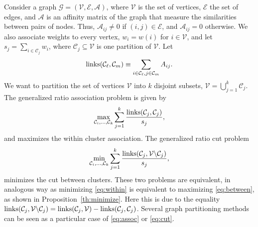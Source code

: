 \documentclass[aps,preprint,nofootinbib,floatfix]{revtex4-1}
\newcommand\C{{\mathcal{C}}}
\begin{document}
Consider a graph $\mathcal{G} = (\mathcal{V}, \mathcal{E}, \mathcal{A})$,
where $\mathcal{V}$ is the set of vertices, $\mathcal{E}$ the set of edges,
and $\mathcal{A}$ is an affinity matrix of the graph 
that measure the 
similarities between pairs of nodes. Thus, $\mathcal{A}_{ij} \ne 0$
if $(i,j) \in \mathcal{E}$, and $\mathcal{A}_{ij} = 0$ otherwise.
We also associate weights to every vertex, 
$w_i = w(i)$ for $i \in \mathcal{V}$, and let $s_j = \sum_{ i \in \C_j} w_i$,
where $\C_j \subseteq \mathcal{V}$ is one partition of $\mathcal{V}$.
Let
\begin{equation}
\textnormal{links}(\C_\ell, \C_m) \equiv 
\sum_{i\in \C_\ell, j\in \C_m } A_{ij} .
\end{equation}
We want to partition the set of vertices $\mathcal{V}$ into $k$ disjoint
subsets, $\mathcal{V} = \bigcup_{j=1}^k \C_j $. 
The generalized ratio association problem is given by
\begin{equation}
\label{eq:assoc}
\max_{\C_i,\dots,\C_k} \sum_{j=1}^k \dfrac{\textnormal{links}(\C_j,\C_j)}{s_j},
\end{equation}
and maximizes the within cluster association.
The generalized ratio cut problem
\begin{equation}
\label{eq:cut}
\min_{\C_i,\dots,\C_k} \sum_{j=1}^k
\dfrac{\textnormal{links}(\C_j,\mathcal{V} \backslash \C_j)}{s_j},
\end{equation}
minimizes the cut between clusters. These two problems are equivalent,
in analogous way as minimizing \eqref{eq:within} is equivalent to
maximizing \eqref{eq:between}, as shown in Proposition~\ref{th:minimize}.
Here this is due to the equality
$\textnormal{links}(\C_j,\mathcal{V} \backslash \C_j)=
\textnormal{links}(\C_j,\mathcal{V}) - \textnormal{links}(\C_j,\C_j)$.
Several graph partitioning methods 
\cite{Kernighan,Malik,Chan,Yu}
can be seen as a particular
case of \eqref{eq:assoc} or \eqref{eq:cut}.
\end{document}
